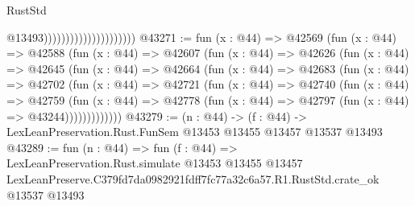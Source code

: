 \begin{lexlean}{RustStd}
\begin{coremodule}
                                              @13493)))))))))))))))))))))
@43271 := fun (x : @44) =>
  @42569
    (fun (x : @44) =>
    @42588
      (fun (x : @44) =>
      @42607
        (fun (x : @44) =>
        @42626
          (fun (x : @44) =>
          @42645
            (fun (x : @44) =>
            @42664
              (fun (x : @44) =>
              @42683
                (fun (x : @44) =>
                @42702
                  (fun (x : @44) =>
                  @42721
                    (fun (x : @44) =>
                    @42740
                      (fun (x : @44) =>
                      @42759
                        (fun (x : @44) =>
                        @42778 (fun (x : @44) => @42797 (fun (x : @44) => @43244)))))))))))))
@43279 := (n : @44) ->
  (f : @44) -> LexLeanPreservation.Rust.FunSem @13453 @13455 @13457 @13537 @13493
@43289 := fun (n : @44) =>
  fun (f : @44) =>
  LexLeanPreservation.Rust.simulate
    @13453
    @13455
    @13457
    LexLeanPreserve.C379fd7da0982921fdff7fc77a32c6a57.R1.RustStd.crate_ok
    @13537
    @13493
\end{coremodule}
\end{lexlean}
